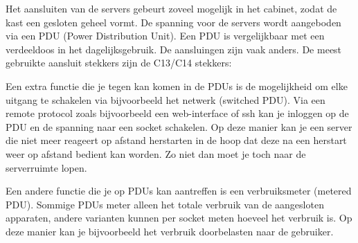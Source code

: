 Het aansluiten van de servers gebeurt zoveel mogelijk in het cabinet, zodat de kast een gesloten geheel vormt. De spanning voor de servers wordt aangeboden via een PDU (Power Distribution Unit). Een PDU is vergelijkbaar met een verdeeldoos in het dagelijksgebruik. De aansluingen zijn vaak anders. De meest gebruikte aansluit stekkers zijn de C13/C14 stekkers:
\begin{figure}
\end{figure}

Een extra functie die je tegen kan komen in de PDUs is de mogelijkheid om elke uitgang te schakelen via bijvoorbeeld het netwerk (switched PDU). Via een remote protocol zoals bijvoorbeeld een web-interface of ssh kan je inloggen op de PDU en de spanning naar een socket schakelen. Op deze manier kan je een server die niet meer reageert op afstand herstarten in de hoop dat deze na een herstart weer op afstand bedient kan worden. Zo niet dan moet je toch naar de serverruimte lopen.

Een andere functie die je op PDUs kan aantreffen is een verbruiksmeter (metered PDU). Sommige PDUs meter alleen het totale verbruik van de aangesloten apparaten, andere varianten kunnen per socket meten hoeveel het verbruik is. Op deze manier kan je bijvoorbeeld het verbruik doorbelasten naar de gebruiker.
